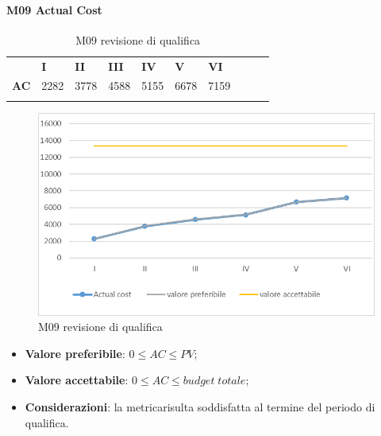 \paragraph{M09 Actual Cost} \mbox{}
\begin{longtable}[H!] {						
		>{}p{50mm}  		
		>{}p{8mm}
		>{}p{8mm}		
		>{}p{8mm}		
		>{}p{8mm}		
		>{}p{8mm}		
		>{}p{8mm}
		>{}p{8mm}
		>{}p{8mm}
		>{}p{8mm}
	}
	\rowcolor{gray!50}
	\textbf{} & \textbf{I} & \textbf{II} & \textbf{III} & \textbf{IV} & \textbf{V} & \textbf{VI} \TBstrut \\ [2mm]
	\textbf{AC} & 2282 & 3778 & 4588 & 5155 & 6678 & 7159 \TBstrut \\ [2mm]
	\rowcolor{white}
	\caption{M09 revisione di qualifica}
\end{longtable}
\begin{figure}[H] 	
	\includegraphics[width=\linewidth]{./img/grafici/RQ9.png}	
	\caption{M09 revisione di qualifica}	
\end{figure}
\begin{itemize}
	\item \textbf{Valore preferibile}: $0\le AC \le PV$;
	\item \textbf{Valore accettabile}: $0 \le AC \le budget \; totale$;
	\item \textbf{Considerazioni}: la metrica\glosp risulta soddisfatta al termine del periodo di qualifica.
\end{itemize}

